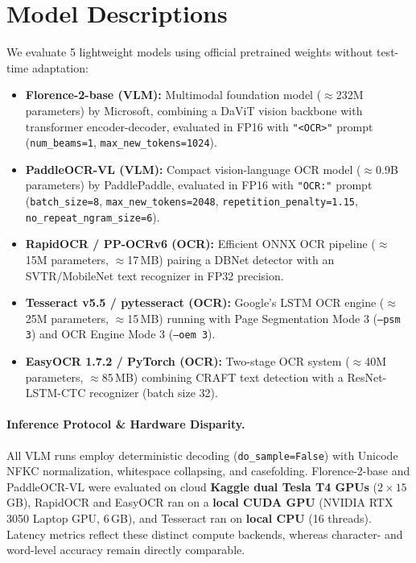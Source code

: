 \section{Model Descriptions}
\label{sec:models}

We evaluate 5 lightweight models using official pretrained weights without test-time adaptation:

\begin{itemize}
    \item \textbf{Florence-2-base (VLM):} Multimodal foundation model ($\approx$232M parameters) by Microsoft, combining a DaViT vision backbone with transformer encoder-decoder, evaluated in FP16 with \texttt{"<OCR>"} prompt (\texttt{num\_beams=1}, \texttt{max\_new\_tokens=1024}).
    \item \textbf{PaddleOCR-VL (VLM):} Compact vision-language OCR model ($\approx$0.9B parameters) by PaddlePaddle, evaluated in FP16 with \texttt{"OCR:"} prompt (\texttt{batch\_size=8}, \texttt{max\_new\_tokens=2048}, \texttt{repetition\_penalty=1.15}, \texttt{no\_repeat\_ngram\_size=6}).
    \item \textbf{RapidOCR / PP-OCRv6 (OCR):} Efficient ONNX OCR pipeline ($\approx$15M parameters, $\approx$17\,MB) pairing a DBNet detector with an SVTR/MobileNet text recognizer in FP32 precision.
    \item \textbf{Tesseract v5.5 / pytesseract (OCR):} Google's LSTM OCR engine ($\approx$25M parameters, $\approx$15\,MB) running with Page Segmentation Mode 3 (\texttt{--psm 3}) and OCR Engine Mode 3 (\texttt{--oem 3}).
    \item \textbf{EasyOCR 1.7.2 / PyTorch (OCR):} Two-stage OCR system ($\approx$40M parameters, $\approx$85\,MB) combining CRAFT text detection with a ResNet-LSTM-CTC recognizer (batch size 32).
\end{itemize}

\paragraph{Inference Protocol \& Hardware Disparity.} All VLM runs employ deterministic decoding (\texttt{do\_sample=False}) with Unicode NFKC normalization, whitespace collapsing, and casefolding. Florence-2-base and PaddleOCR-VL were evaluated on cloud \textbf{Kaggle dual Tesla T4 GPUs} ($2\times 15$\,GB), RapidOCR and EasyOCR ran on a \textbf{local CUDA GPU} (NVIDIA RTX 3050 Laptop GPU, 6\,GB), and Tesseract ran on \textbf{local CPU} (16 threads). Latency metrics reflect these distinct compute backends, whereas character- and word-level accuracy remain directly comparable.

